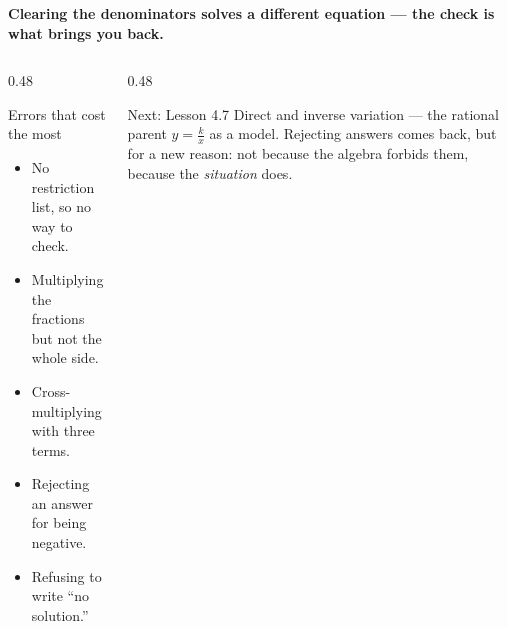 \documentclass[aspectratio=169, 11pt]{beamer}
\begin{document}
\begin{frame}[t, plain]
  \begin{block}{}
    \centering\textbf{Clearing the denominators solves a different equation --- the check is what
    brings you back.}
  \end{block}
  \vspace{6pt}
  \begin{columns}[T]
    \begin{column}{0.48\textwidth}
      \begin{block}{Errors that cost the most}
        \begin{itemize}\setlength{\itemsep}{2pt}
          \item No restriction list, so no way to check.
          \item Multiplying the fractions but not the whole side.
          \item Cross-multiplying with three terms.
          \item Rejecting an answer for being negative.
          \item Refusing to write ``no solution.''
        \end{itemize}
      \end{block}
    \end{column}
    \begin{column}{0.48\textwidth}
      \begin{block}{Next: Lesson 4.7}
        Direct and inverse variation --- the rational parent $y=\frac kx$ as a model. Rejecting answers
        comes back, but for a new reason: not because the algebra forbids them, because the
        \emph{situation} does.
      \end{block}
    \end{column}
  \end{columns}
\end{frame}
\end{document}
